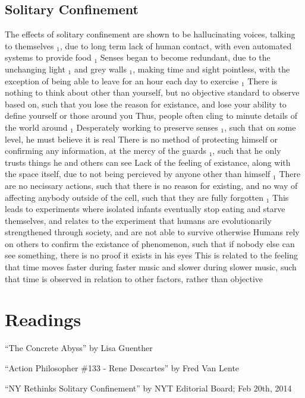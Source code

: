 \documentclass[11 pt, twoside]{article}
\newenvironment{outline*}
{
	\begin{outline}[enumerate]
	}
	{\end{outline}
}
\newcommand{\foota}[1]{\hyperlink{#1}{$_#1$}}
\begin{document}
\subsection{Solitary Confinement}
\begin{outline*}
\1 The effects of solitary confinement are shown to be hallucinating voices, talking to themselves \foota{1}, due to long term lack of human contact, with even automated systems to provide food \foota{1}
\2 Senses began to become redundant, due to the unchanging light \foota{1} and grey walls \foota{1}, making time and sight pointless, with the exception of being able to leave for an hour each day to exercise \foota{1}
\3 There is nothing to think about other than yourself, but no objective standard to observe based on, such that you lose the reason for existance, and lose your ability to define yourself or those around you
\3 Thus, people often cling to minute details of the world around \foota{1}
\3 Desperately working to preserve senses \foota{1}, such that on some level, he must believe it is real
\2 There is no method of protecting himself or confirming any information, at the mercy of the guards \foota{1}, such that he only trusts things he and others can see
\2 Lack of the feeling of existance, along with the space itself, due to not being percieved by anyone other than himself \foota{1}
\3 There are no necissary actions, such that there is no reason for existing, and no way of affecting anybody outside of the cell, such that they are fully forgotten \foota{1}
\4 This leads to experiments where isolated infants eventually stop eating and starve themselves, and relates to the experiment that humans are evolutionarily strengthened through society, and are not able to survive otherwise
\3 Humans rely on others to confirm the existance of phenomenon, such that if nobody else can see something, there is no proof it exists in his eyes
\1 This is related to the feeling that time moves faster during faster music and slower during slower music, such that time is observed in relation to other factors, rather than objective
\end{outline*}

\section{Readings}
\begin{enumerate}
\hypertarget{1}{\item ``The Concrete Abyss'' by Lisa Guenther}
\hypertarget{2}{\item ``Action Philosopher \#133 - Rene Descartes'' by Fred Van Lente}
\hypertarget{3}{\item ``NY Rethinks Solitary Confinement'' by NYT Editorial Board; Feb 20th, 2014}
\end{enumerate}
\end{document}
